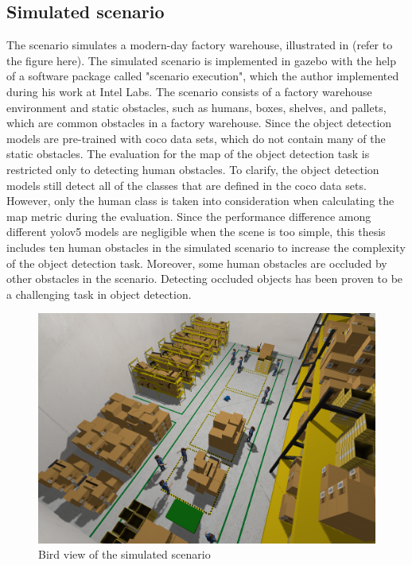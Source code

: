 \subsection{Simulated scenario}

The scenario simulates a modern-day factory warehouse, illustrated in (refer to the figure here). The simulated scenario is implemented in \gls{gazebo} with the help of a software package called "scenario execution", which the author implemented during his work at Intel Labs. The scenario consists of a factory warehouse environment and static obstacles, such as humans, boxes, shelves, and pallets, which are common obstacles in a factory warehouse. Since the object detection models are pre-trained with \gls{coco} data sets, which do not contain many of the static obstacles. The evaluation for the \gls{map} of the object detection task is restricted only to detecting human obstacles. To clarify, the object detection models still detect all of the classes that are defined in the \gls{coco} data sets. However, only the human class is taken into consideration when calculating the \gls{map} metric during the evaluation. Since the performance difference among different \gls{yolov5} models are negligible when the scene is too simple, this thesis includes ten human obstacles in the simulated scenario to increase the complexity of the object detection task. Moreover, some human obstacles are occluded by other obstacles in the scenario. Detecting occluded objects has been proven to be a challenging task in object detection. 

\begin{figure}
    \centering
    \includegraphics[width=\linewidth]{figures/sim/bird_view.png}
    \caption{Bird view of the simulated scenario}
    \label{fig:bird_view_scenario}
\end{figure}

